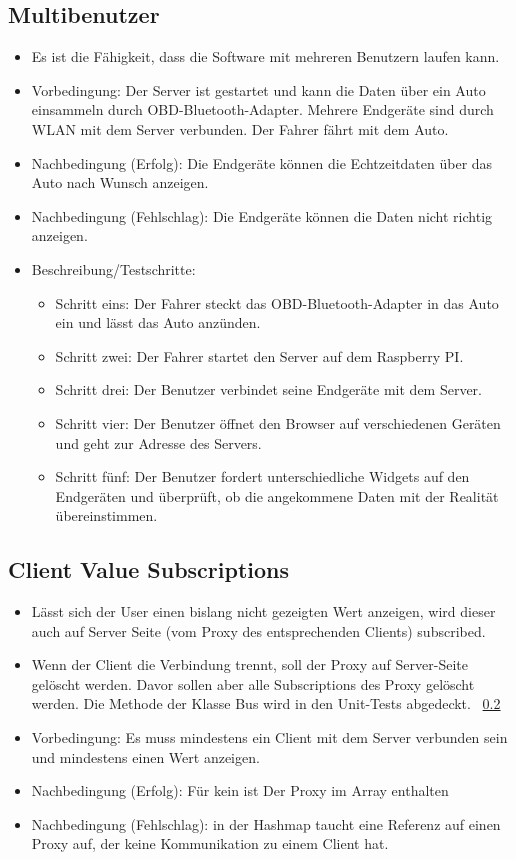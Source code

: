 \documentclass[qualitaetssicherung.tex]{subfiles}
\begin{document}
	\subsection{Multibenutzer}
		\begin{itemize}
			\item
			Es ist die Fähigkeit, dass die Software mit mehreren Benutzern laufen kann.
			\item
			Vorbedingung: Der Server ist gestartet und kann die Daten über ein Auto
			einsammeln durch OBD-Bluetooth-Adapter. Mehrere Endgeräte sind durch WLAN
			mit dem Server verbunden. Der Fahrer fährt mit dem Auto.
			\item
			Nachbedingung (Erfolg): Die Endgeräte können die Echtzeitdaten über das
			Auto nach Wunsch anzeigen.
			\item
			Nachbedingung (Fehlschlag): Die Endgeräte können die Daten nicht richtig
			anzeigen.
			\item
			Beschreibung/Testschritte:
			\begin{itemize}
				\item
				Schritt eins: Der Fahrer steckt das OBD-Bluetooth-Adapter in das Auto
				ein und lässt das Auto anzünden.
				\item
				Schritt zwei: Der Fahrer startet den Server auf dem Raspberry PI.
				\item
				Schritt drei: Der Benutzer verbindet seine Endgeräte mit dem Server.
				\item 
				Schritt vier: Der Benutzer öffnet den Browser auf verschiedenen Geräten
				und geht zur Adresse des Servers.
				\item 
				Schritt fünf: Der Benutzer fordert unterschiedliche Widgets auf den
				Endgeräten und überprüft, ob die angekommene Daten mit der Realität
				übereinstimmen.
			\end{itemize}
		\end{itemize}
			\subsection{Client Value Subscriptions}
		\begin{itemize}
			\item Lässt sich der User einen bislang nicht gezeigten Wert anzeigen, wird dieser auch auf Server Seite (vom Proxy des entsprechenden Clients) subscribed.
			\item Wenn der Client die Verbindung trennt, soll der Proxy auf Server-Seite gelöscht werden. Davor sollen aber alle Subscriptions des Proxy gelöscht werden. Die Methode  der Klasse Bus wird in den Unit-Tests abgedeckt.  ~\ref{}
			\item Vorbedingung: Es muss mindestens ein Client mit dem Server verbunden sein und mindestens einen Wert anzeigen.
			\item
			Nachbedingung (Erfolg): Für kein  ist Der Proxy im Array  enthalten
			\item
			Nachbedingung (Fehlschlag): in der Hashmap  taucht eine Referenz auf einen Proxy auf, der keine Kommunikation zu einem Client hat.
		\end{itemize}
\end{document}

